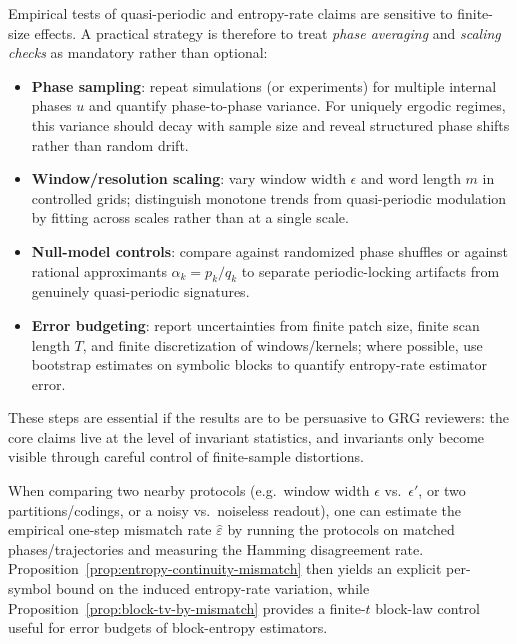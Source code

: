 Empirical tests of quasi-periodic and entropy-rate claims are sensitive to finite-size effects. A practical strategy is therefore to treat \emph{phase averaging} and \emph{scaling checks} as mandatory rather than optional:
\begin{itemize}[leftmargin=*,itemsep=2pt]
  \item \textbf{Phase sampling}: repeat simulations (or experiments) for multiple internal phases $u$ and quantify phase-to-phase variance. For uniquely ergodic regimes, this variance should decay with sample size and reveal structured phase shifts rather than random drift.
  \item \textbf{Window/resolution scaling}: vary window width $\epsilon$ and word length $m$ in controlled grids; distinguish monotone trends from quasi-periodic modulation by fitting across scales rather than at a single scale.
  \item \textbf{Null-model controls}: compare against randomized phase shuffles or against rational approximants $\alpha_k=p_k/q_k$ to separate periodic-locking artifacts from genuinely quasi-periodic signatures.
  \item \textbf{Error budgeting}: report uncertainties from finite patch size, finite scan length $T$, and finite discretization of windows/kernels; where possible, use bootstrap estimates on symbolic blocks to quantify entropy-rate estimator error.
\end{itemize}

These steps are essential if the results are to be persuasive to GRG reviewers: the core claims live at the level of invariant statistics, and invariants only become visible through careful control of finite-sample distortions.

\begin{remark}\label{rem:protocol-variation-errorbars}
When comparing two nearby protocols (e.g.\ window width $\epsilon$ vs.\ $\epsilon'$, or two partitions/codings, or a noisy vs.\ noiseless readout), one can estimate the empirical one-step mismatch rate $\widehat\varepsilon$ by running the protocols on matched phases/trajectories and measuring the Hamming disagreement rate. Proposition~\ref{prop:entropy-continuity-mismatch} then yields an explicit per-symbol bound on the induced entropy-rate variation, while Proposition~\ref{prop:block-tv-by-mismatch} provides a finite-$t$ block-law control useful for error budgets of block-entropy estimators.
\end{remark}

